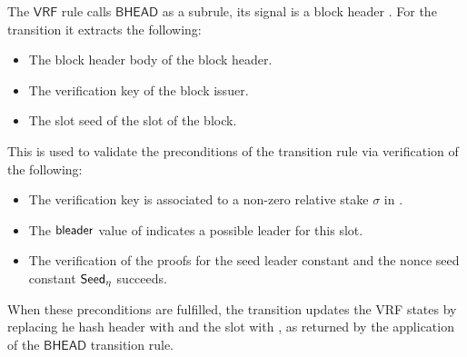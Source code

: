 The $\mathsf{VRF}$ rule calls $\mathsf{BHEAD}$ as a subrule, its signal is a
block header . For the transition it extracts the following:

\begin{itemize}
\item The block header body  of the block header.
\item The verification key  of the block issuer.
\item The slot seed  of the slot of the block.
\end{itemize}

This is used to validate the preconditions of the transition rule via
verification of the following:

\begin{itemize}
\item The verification key is associated to a non-zero relative stake
  $\sigma$ in .
\item The $\mathsf{bleader}$ value of  indicates a possible leader for
  this slot.
\item The verification of the proofs for the seed leader constant \var{\Seedl}
  and the nonce seed constant $\mathsf{Seed}_\eta$ succeeds.
\end{itemize}

When these preconditions are fulfilled, the transition updates the VRF states by
replacing he hash header with  and the slot with , as
returned by the application of the $\mathsf{BHEAD}$ transition rule.

